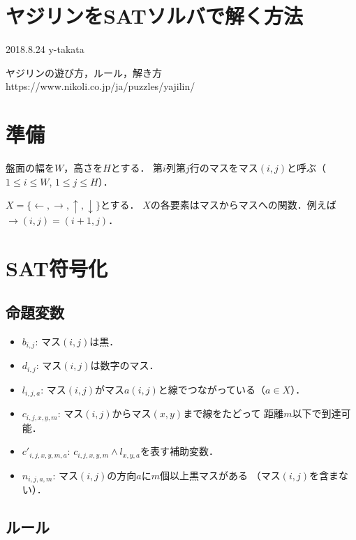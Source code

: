 \documentclass[a4j]{jarticle}
\newcommand{\←}{{\leftarrow}}
\newcommand{\→}{{\rightarrow}}
\newcommand{\↑}{{\uparrow}}
\newcommand{\↓}{{\downarrow}}
\begin{document}
\section*{ヤジリンをSATソルバで解く方法}
\begin{flushright}
2018.8.24 y-takata
\end{flushright}

ヤジリンの遊び方，ルール，解き方\\
https://www.nikoli.co.jp/ja/puzzles/yajilin/

\section{準備}
盤面の幅を$W$，高さを$H$とする．
第$i$列第$j$行のマスをマス$(i,j)$と呼ぶ（$1\le i\le W$, $1\le j\le H$）．

$X=\{\←,\→,\↑,\↓\}$とする．
$X$の各要素はマスからマスへの関数．例えば$\→(i,j)=(i+1,j)$．

\section{SAT符号化}
\subsection{命題変数}
\begin{itemize}
\item $b_{i,j}$: マス$(i,j)$は黒．
\item $d_{i,j}$: マス$(i,j)$は数字のマス．
\item $l_{i,j,a}$: マス$(i,j)$がマス$a(i,j)$と線でつながっている（$a\in X$）．
\item $c_{i,j,x,y,m}$: マス$(i,j)$からマス$(x,y)$まで線をたどって
  距離$m$以下で到達可能．
\item $c'_{i,j,x,y,m,a}$: $c_{i,j,x,y,m}\land l_{x,y,a}$を表す補助変数．
\item $n_{i,j,a,m}$: マス$(i,j)$の方向$a$に$m$個以上黒マスがある
  （マス$(i,j)$を含まない）．
\end{itemize}

\subsection{ルール}
\end{document}
